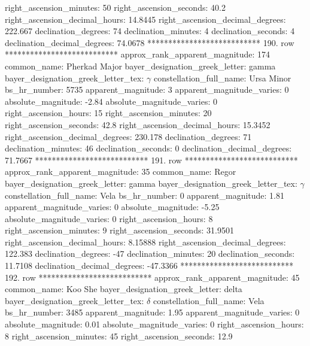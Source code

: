            right_ascension_minutes: 50
           right_ascension_seconds: 40.2
     right_ascension_decimal_hours: 14.8445
   right_ascension_decimal_degrees: 222.667
               declination_degrees: 74
               declination_minutes: 4
               declination_seconds: 4
       declination_decimal_degrees: 74.0678
*************************** 190. row ***************************
    approx_rank_apparent_magnitude: 174
                       common_name: Pherkad Major
    bayer_designation_greek_letter: gamma
bayer_designation_greek_letter_tex: $\gamma$
           constellation_full_name: Ursa Minor
                      bs_hr_number: 5735
                apparent_magnitude: 3
         apparent_magnitude_varies: 0
                absolute_magnitude: -2.84
         absolute_magnitude_varies: 0
             right_ascension_hours: 15
           right_ascension_minutes: 20
           right_ascension_seconds: 42.8
     right_ascension_decimal_hours: 15.3452
   right_ascension_decimal_degrees: 230.178
               declination_degrees: 71
               declination_minutes: 46
               declination_seconds: 0
       declination_decimal_degrees: 71.7667
*************************** 191. row ***************************
    approx_rank_apparent_magnitude: 35
                       common_name: Regor
    bayer_designation_greek_letter: gamma
bayer_designation_greek_letter_tex: $\gamma$
           constellation_full_name: Vela
                      bs_hr_number: 0
                apparent_magnitude: 1.81
         apparent_magnitude_varies: 0
                absolute_magnitude: -5.25
         absolute_magnitude_varies: 0
             right_ascension_hours: 8
           right_ascension_minutes: 9
           right_ascension_seconds: 31.9501
     right_ascension_decimal_hours: 8.15888
   right_ascension_decimal_degrees: 122.383
               declination_degrees: -47
               declination_minutes: 20
               declination_seconds: 11.7108
       declination_decimal_degrees: -47.3366
*************************** 192. row ***************************
    approx_rank_apparent_magnitude: 45
                       common_name: Koo She
    bayer_designation_greek_letter: delta
bayer_designation_greek_letter_tex: $\delta$
           constellation_full_name: Vela
                      bs_hr_number: 3485
                apparent_magnitude: 1.95
         apparent_magnitude_varies: 0
                absolute_magnitude: 0.01
         absolute_magnitude_varies: 0
             right_ascension_hours: 8
           right_ascension_minutes: 45
           right_ascension_seconds: 12.9
